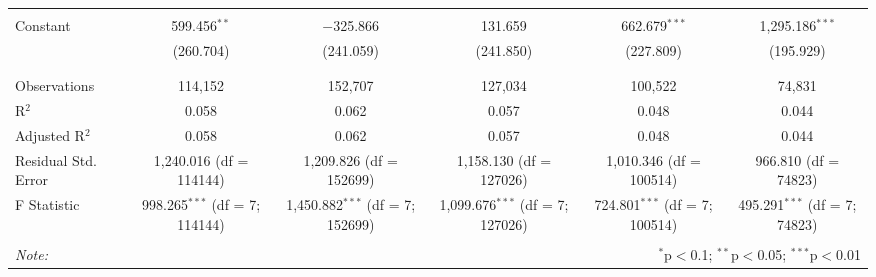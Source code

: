 \begin{table}[!htbp]
\begin{tabular}{@{\extracolsep{5pt}}lccccc}
  & & & & & \\ 
 Constant & 599.456$^{**}$ & $-$325.866 & 131.659 & 662.679$^{***}$ & 1,295.186$^{***}$ \\ 
  & (260.704) & (241.059) & (241.850) & (227.809) & (195.929) \\ 
  & & & & & \\ 
\hline \\[-1.8ex] 
Observations & 114,152 & 152,707 & 127,034 & 100,522 & 74,831 \\ 
R$^{2}$ & 0.058 & 0.062 & 0.057 & 0.048 & 0.044 \\ 
Adjusted R$^{2}$ & 0.058 & 0.062 & 0.057 & 0.048 & 0.044 \\ 
Residual Std. Error & 1,240.016 (df = 114144) & 1,209.826 (df = 152699) & 1,158.130 (df = 127026) & 1,010.346 (df = 100514) & 966.810 (df = 74823) \\ 
F Statistic & 998.265$^{***}$ (df = 7; 114144) & 1,450.882$^{***}$ (df = 7; 152699) & 1,099.676$^{***}$ (df = 7; 127026) & 724.801$^{***}$ (df = 7; 100514) & 495.291$^{***}$ (df = 7; 74823) \\ 
\hline 
\hline \\[-1.8ex] 
\textit{Note:}  & \multicolumn{5}{r}{$^{*}$p$<$0.1; $^{**}$p$<$0.05; $^{***}$p$<$0.01} \\ 
\end{tabular} 
\end{table} 
